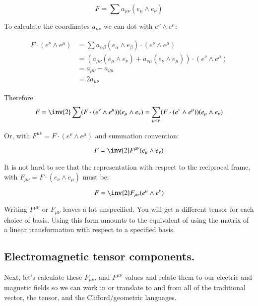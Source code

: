\documentclass{article}
\begin{document}
\begin{equation*}
F = \sum a_{{\mu} {\nu}} (e_{\mu} \wedge e_{\nu})
\end{equation*}

To calculate the coordinates $a_{{\mu} {\nu}}$ we can dot with
$e^{\nu} \wedge e^{\mu}$:

\begin{align*}
F \cdot (e^{\nu} \wedge e^{\mu})
&= \sum a_{{\alpha} {\beta}} (e_{\alpha} \wedge e_{\beta}) \cdot (e^{\nu} \wedge e^{\mu}) \\
&= ( a_{{\mu} {\nu}} (e_{\mu} \wedge e_{\nu}) + a_{{\nu} {\mu}} (e_{\nu} \wedge e_{\mu}) ) \cdot (e^{\nu} \wedge e^{\mu}) \\
&= a_{{\mu} {\nu}} - a_{{\nu} {\mu}} \\
&= 2 a_{{\mu} {\nu}}
\end{align*}

Therefore
\begin{equation*}
F = \inv{2} \sum (F \cdot (e^{\nu} \wedge e^{\mu})) (e_{\mu} \wedge e_{\nu}) = \sum_{{\mu}<{\nu}} (F \cdot (e^{\nu} \wedge e^{\mu})) (e_{\mu} \wedge e_{\nu})
\end{equation*}

Or, with $F^{{\mu} {\nu}} = F \cdot (e^{\nu} \wedge e^{\mu})$ and summation convention:

\begin{equation}
F = \inv{2} F^{{\mu} {\nu}} (e_{\mu} \wedge e_{\nu})
\end{equation}

It is not hard to see that the representation with respect to the reciprocal frame, with
$F_{{\mu} {\nu}} = F \cdot (e_{\nu} \wedge e_{\mu})$ must be:

\begin{equation}
F = \inv{2} F_{{\mu} {\nu}} (e^{\mu} \wedge e^{\nu})
\end{equation}

Writing $F^{\mu\nu}$ or $F_{\mu\nu}$ leaves a lot unspecified.  You will get a different tensor for each choice of basis.  Using this form amounts to the equivalent of using the matrix of a linear transformation with respect to a specified basis.

\subsection{ Electromagnetic tensor components. }

Next, let's calculate these
$F_{{\mu} {\nu}}$, and $F^{{\mu} {\nu}}$ values and relate them to our electric and magnetic fields so we can work in or translate to and from all of the traditional vector, the tensor, and the Clifford/geometric languages.
\end{document}
